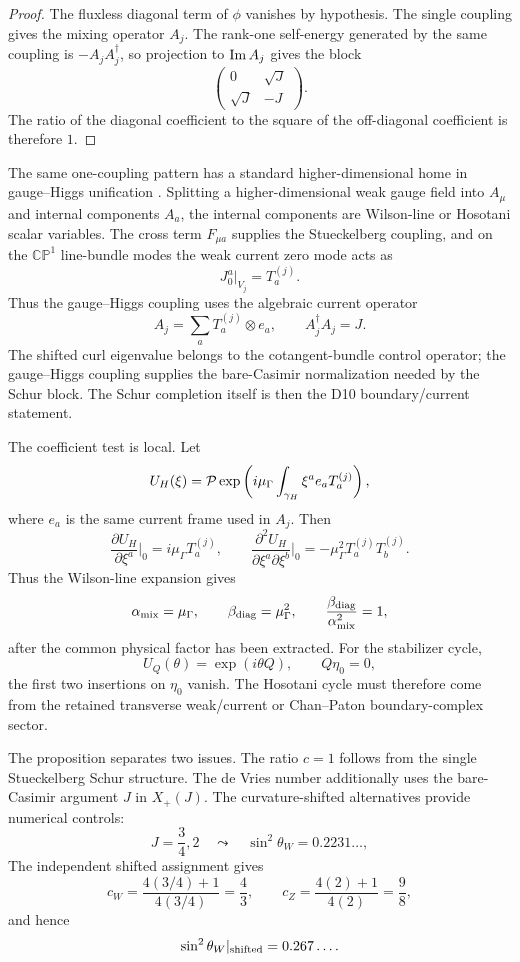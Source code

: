 \documentclass[11pt]{article}
\theoremstyle{definition}
\theoremstyle{remark}
\newcommand{\CP}{\mathbb{CP}}
\newcommand{\Xp}{X_+}
\newcommand{\sinsq}{\sin^2\theta_W}
\begin{document}
\begin{proof}
The fluxless diagonal term of \(\phi\) vanishes by hypothesis.  The single
coupling gives the mixing operator \(A_j\).  The rank-one self-energy generated
by the same coupling is \(-A_jA_j^\dagger\), so projection to
\({\rm Im}\,A_j\) gives the block
\[
  \begin{pmatrix}
  0&\sqrt J\\
  \sqrt J&-J
  \end{pmatrix}.
\]
The ratio of the diagonal coefficient to the square of the off-diagonal
coefficient is therefore \(1\).
\end{proof}

The same one-coupling pattern has a standard higher-dimensional home in
gauge--Higgs unification \cite{Manton1979,Hosotani1983}.  Splitting a
higher-dimensional weak gauge field into \(A_\mu\) and internal components
\(A_a\), the internal components are Wilson-line or Hosotani scalar variables.
The cross term \(F_{\mu a}\) supplies the Stueckelberg coupling, and on the
\(\CP^1\) line-bundle modes the weak current zero mode acts as
\[
  J_0^a|_{V_j}=T_a^{(j)}.
\]
Thus the gauge--Higgs coupling uses the algebraic current operator
\[
  A_j=\sum_aT_a^{(j)}\otimes e_a,\qquad A_j^\dagger A_j=J.
\]
The shifted curl eigenvalue belongs to the cotangent-bundle control operator;
the gauge--Higgs coupling supplies the bare-Casimir normalization needed by the
Schur block.  The Schur completion itself is then the D10 boundary/current
statement.

The coefficient test is local.  Let
\[
  U_H(\xi)
  =
  {\cal P}\exp\left(
  i\mu_\Gamma\int_{\gamma_H}\xi^a e_aT_a^{(j)}
  \right),
\]
where \(e_a\) is the same current frame used in \(A_j\).  Then
\[
  \frac{\partial U_H}{\partial\xi^a}\bigg|_0
  =
  i\mu_\Gamma T_a^{(j)},
  \qquad
  \frac{\partial^2U_H}{\partial\xi^a\partial\xi^b}\bigg|_0
  =
  -\mu_\Gamma^2T_a^{(j)}T_b^{(j)}.
\]
Thus the Wilson-line expansion gives
\[
  \alpha_{\rm mix}=\mu_\Gamma,\qquad
  \beta_{\rm diag}=\mu_\Gamma^2,\qquad
  \frac{\beta_{\rm diag}}{\alpha_{\rm mix}^2}=1,
\]
after the common physical factor has been extracted.  For the stabilizer
cycle,
\[
  U_Q(\theta)=\exp(i\theta Q),\qquad Q\eta_0=0,
\]
the first two insertions on \(\eta_0\) vanish.  The Hosotani cycle must
therefore come from the retained transverse weak/current or Chan--Paton
boundary-complex sector.

The proposition separates two issues.  The ratio \(c=1\) follows from the
single Stueckelberg Schur structure.  The de Vries number additionally uses the
bare-Casimir argument \(J\) in \(\Xp(J)\).  The curvature-shifted alternatives
provide numerical controls:
\[
  J=\frac34,2
  \quad\leadsto\quad
  \sinsq=0.2231\ldots ,
\]
The independent shifted assignment gives
\[
  c_W=\frac{4(3/4)+1}{4(3/4)}=\frac43,\qquad
  c_Z=\frac{4(2)+1}{4(2)}=\frac98,
\]
and hence
\[
  \sin^2\theta_W|_{\rm shifted}=0.267\ldots .
\]
\end{document}
